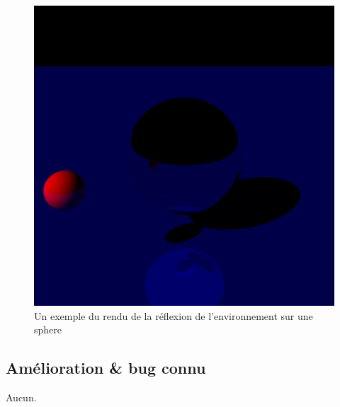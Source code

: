 \begin{figure}[h]
  \begin{center}
    \includegraphics[width=\textwidth, keepaspectratio=true]{../../diary/10.png}
    \caption{Un exemple du rendu de la réflexion de l'environnement sur une
    sphere\label{fig:reflection}}
  \end{center}
\end{figure}

\subsection{Amélioration \& bug connu}
Aucun.
